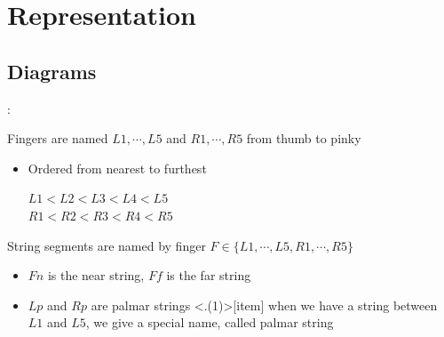 \newcommand\w[1]{\texttt{[image: \#1]}}
\section{Representation}

\subsection{Diagrams}
\begin{frame}{\secname: \subsecname}

\pause Fingers are named $L1,\cdots, L5$ and $R1,\cdots,R5$ from thumb to pinky

\begin{itemize}
    \item \pause Ordered from nearest to furthest
    \pause \begin{center}
    $L1\lt L2\lt L3\lt L4\lt L5$\\
    $R1\lt R2\lt R3\lt R4\lt R5$    
    \end{center}
\end{itemize}

\pause String segments are named by finger $F\in\{L1,\cdots, L5,R1,\cdots,R5\}$
\begin{itemize}[<+(1)->]
    \item $Fn$ is the near string, $Ff$ is the far string
    \item $Lp$ and $Rp$ are palmar strings
\note<.(1)>[item]{ when we have a string between $L1$ and $L5$, we give a special name, called palmar string}
\end{itemize}
\end{frame}

